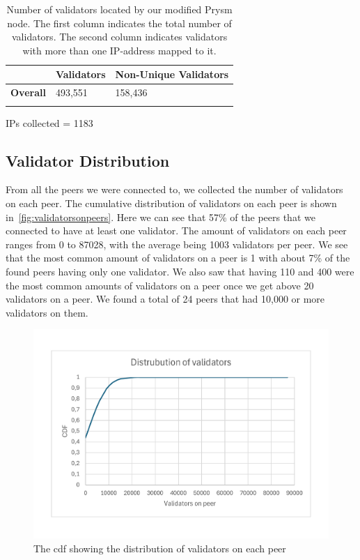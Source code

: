 \begin{table}[]
    \centering
    \begin{tabular}{lll}
        \hline
        & \textbf{Validators} & \textbf{Non-Unique Validators} \\ \hline
        \textbf{Overall} & 493,551             & 158,436                        \\ \hline
        \\
    \end{tabular}
    \caption{Number of validators located by our modified Prysm node. The first column indicates the total number of validators. The second column indicates validators with more than one IP-address mapped to it.}
    \label{tab:unique vals}
\end{table}

IPs collected = 1183

\subsection{Validator Distribution}\label{subsec:validator-distribution}
From all the peers we were connected to, we collected the number of validators on each peer.
The cumulative distribution of validators on each peer is shown in~\autoref{fig:validatorsonpeers}.
Here we can see that 57\% of the peers that we connected to have at least one validator.
The amount of validators on each peer ranges from 0 to 87028, with the average being 1003 validators per peer.
We see that the most common amount of validators on a peer is 1 with about 7\% of the found peers having only one validator.
We also saw that having 110 and 400 were the most common amounts of validators on a peer once we get above 20 validators on a peer.
We found a total of 24 peers that had 10,000 or more validators on them.
\begin{figure}[!ht]
    \centering
    \includegraphics[scale = 0.45]{figures/distval}
    \caption{The cdf showing the distribution of validators on each peer}
    \label{fig:validatorsonpeers}
\end{figure}